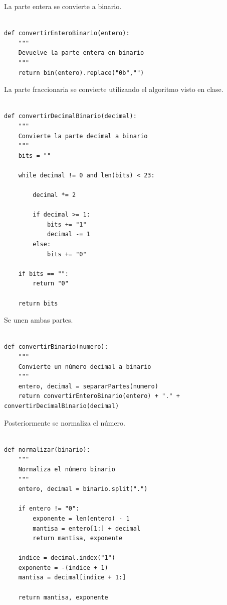\documentclass[11pt]{article}
\begin{document}
La parte entera se convierte a binario.

\begin{verbatim}

def convertirEnteroBinario(entero):
    """
    Devuelve la parte entera en binario
    """
    return bin(entero).replace("0b","")

\end{verbatim}

La parte fraccionaria se convierte utilizando el algoritmo visto en
clase.

\begin{verbatim}

def convertirDecimalBinario(decimal):
    """
    Convierte la parte decimal a binario
    """
    bits = ""

    while decimal != 0 and len(bits) < 23:

        decimal *= 2

        if decimal >= 1:
            bits += "1"
            decimal -= 1
        else:
            bits += "0"

    if bits == "":
        return "0"

    return bits

\end{verbatim}

Se unen ambas partes.

\begin{verbatim}

def convertirBinario(numero):
    """
    Convierte un número decimal a binario
    """
    entero, decimal = separarPartes(numero)
    return convertirEnteroBinario(entero) + "." + convertirDecimalBinario(decimal)

\end{verbatim}

Posteriormente se normaliza el número.

\begin{verbatim}

def normalizar(binario):
    """
    Normaliza el número binario
    """
    entero, decimal = binario.split(".")

    if entero != "0":
        exponente = len(entero) - 1
        mantisa = entero[1:] + decimal
        return mantisa, exponente

    indice = decimal.index("1")
    exponente = -(indice + 1)
    mantisa = decimal[indice + 1:]

    return mantisa, exponente

\end{verbatim}
\end{document}
